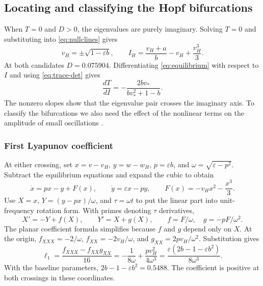 \documentclass[11pt,a4paper]{article}
\begin{document}
\clearpage

\subsection{Locating and classifying the Hopf bifurcations}

When \(T=0\) and \(D>0\), the eigenvalues are purely imaginary. Solving \(T=0\) and substituting into \eqref{eq:nullclines} gives
\begin{equation}
  v_H=\pm\sqrt{1-\varepsilon b},
  \qquad
  I_H=\frac{v_H+a}{b}-v_H+\frac{v_H^3}{3}.
  \label{eq:hopf}
\end{equation}
At both candidates \(D=0.075904\). Differentiating \eqref{eq:equilibrium} with respect to \(I\) and using \eqref{eq:trace-det} gives
\begin{equation}
  \frac{dT}{dI}=-\frac{2bv_*}{bv_*^2+1-b}.
\end{equation}
The nonzero slopes show that the eigenvalue pair crosses the imaginary axis. To classify the bifurcations we also need the effect of the nonlinear terms on the amplitude of small oscillations \cite{kuznetsov2006}.

\subsubsection*{First Lyapunov coefficient}

At either crossing, set \(x=v-v_H\), \(y=w-w_H\), \(p=\varepsilon b\), and \(\omega=\sqrt{\varepsilon-p^2}\). Subtract the equilibrium equations and expand the cubic to obtain
\[
  \dot x=px-y+F(x),\qquad
  \dot y=\varepsilon x-py,\qquad
  F(x)=-v_Hx^2-\frac{x^3}{3}.
\]
Use \(X=x\), \(Y=(y-px)/\omega\), and \(\tau=\omega t\) to put the linear part into unit-frequency rotation form. With primes denoting \(\tau\) derivatives,
\[
  X'=-Y+f(X),\qquad Y'=X+g(X),\qquad
  f=F/\omega,\quad g=-pF/\omega^2.
\]
The planar coefficient formula \cite{guckenheimer1983} simplifies because \(f\) and \(g\) depend only on \(X\). At the origin, \(f_{XXX}=-2/\omega\), \(f_{XX}=-2v_H/\omega\), and \(g_{XX}=2pv_H/\omega^2\). Substitution gives
\begin{equation}
  \ell_1=\frac{f_{XXX}-f_{XX}g_{XX}}{16}
        =-\frac{1}{8\omega}+\frac{pv_H^2}{4\omega^3}
        =\frac{\varepsilon(2b-1-\varepsilon b^2)}{8\omega^3}.
  \label{eq:hopf-coefficient}
\end{equation}
With the baseline parameters, \(2b-1-\varepsilon b^2=0.5488\). The coefficient is positive at both crossings in these coordinates.
\end{document}
